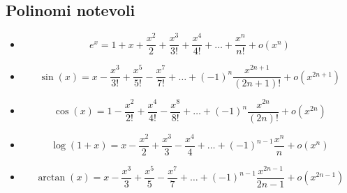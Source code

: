 \documentclass[a4paper]{article}
\theoremstyle{break}
\theoremstyle{break}
\theoremstyle{break}
\theoremstyle{break}
\begin{document}
\subsection{Polinomi notevoli}
\begin{itemize}
  \item \[
      e^x = 1+x+\frac{x^2}{2} + \frac{x^3}{3!} + \frac{x^4}{4!} + \ldots + \frac{x^n}{n!} + o(x^n)
    \] 
  \item \[
      \sin(x) = x - \frac{x^3}{3!} + \frac{x^5}{5!} - \frac{x^7}{7!} + \ldots + (-1)^n \frac{x^{2n+1}}{(2n+1)!} + o(x^{2n+1})
    \] 
  \item
    \[
      \cos(x) = 1 - \frac{x^2}{2!} + \frac{x^4}{4!} - \frac{x^8}{8!} + \ldots + (-1)^n \frac{x^{2n}}{(2n)!} + o(x^{2n})
    \] 
  \item
    \[
      \log(1+x) = x - \frac{x^2}{2} + \frac{x^3}{3} - \frac{x^4}{4} + \ldots + (-1)^{n-1} \frac{x^n}{n} + o(x^n)
    \] 
  \item
    \[
      \arctan(x) = x - \frac{x^3}{3} + \frac{x^5}{5} - \frac{x^7}{7} + \ldots + (-1)^{n-1} \frac{x^{2n-1}}{2n-1} + o(x^{2n-1})
    \] 
\end{itemize}
\end{document}
